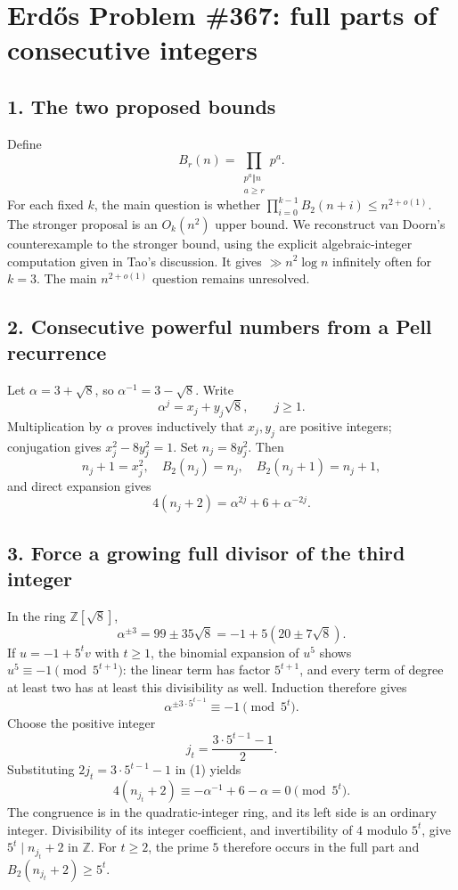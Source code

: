 \section*{Erd\H{o}s Problem \#367: full parts of consecutive integers}
\subsection*{1. The two proposed bounds}
Define
\[
 B_r(n)=\prod_{\substack{p^a\Vert n\\a\ge r}}p^a.
\]
For each fixed $k$, the main question is whether
$\prod_{i=0}^{k-1}B_2(n+i)\le n^{2+o(1)}$.
The stronger proposal is an $O_k(n^2)$ upper bound.
We reconstruct van Doorn's counterexample to the stronger bound,
using the explicit algebraic-integer computation given in Tao's
discussion. It gives $\gg n^2\log n$ infinitely often for $k=3$.
The main $n^{2+o(1)}$ question remains unresolved.

\subsection*{2. Consecutive powerful numbers from a Pell recurrence}
Let $\alpha=3+\sqrt8$, so $\alpha^{-1}=3-\sqrt8$.
Write
\[
 \alpha^j=x_j+y_j\sqrt8,\qquad j\ge1.
\]
Multiplication by $\alpha$ proves inductively that $x_j,y_j$ are
positive integers; conjugation gives $x_j^2-8y_j^2=1$.
Set $n_j=8y_j^2$. Then
\[
 n_j+1=x_j^2,\quad
 B_2(n_j)=n_j,\quad B_2(n_j+1)=n_j+1,
\]
and direct expansion gives
\[
 4(n_j+2)=\alpha^{2j}+6+\alpha^{-2j}.             \tag{1}
\]

\subsection*{3. Force a growing full divisor of the third integer}
In the ring $\mathbb Z[\sqrt8]$,
\[
 \alpha^{\pm3}=99\pm35\sqrt8
       =-1+5(20\pm7\sqrt8).
\]
If $u=-1+5^t v$ with $t\ge1$, the binomial expansion of $u^5$
shows $u^5\equiv-1\pmod{5^{t+1}}$:
the linear term has factor $5^{t+1}$, and every term of degree
at least two has at least this divisibility as well.
Induction therefore gives
\[
 \alpha^{\pm3\cdot5^{t-1}}\equiv-1\pmod{5^t}.
\]
Choose the positive integer
\[
 j_t=\frac{3\cdot5^{t-1}-1}{2}.
\]
Substituting $2j_t=3\cdot5^{t-1}-1$ in (1) yields
\[
 4(n_{j_t}+2)
 \equiv-\alpha^{-1}+6-\alpha=0\pmod{5^t}.
\]
The congruence is in the quadratic-integer ring, and its left side
is an ordinary integer. Divisibility of its integer coefficient,
and invertibility of $4$ modulo $5^t$, give
$5^t\mid n_{j_t}+2$ in $\mathbb Z$.
For $t\ge2$, the prime $5$ therefore occurs in the full part and
$B_2(n_{j_t}+2)\ge5^t$.

